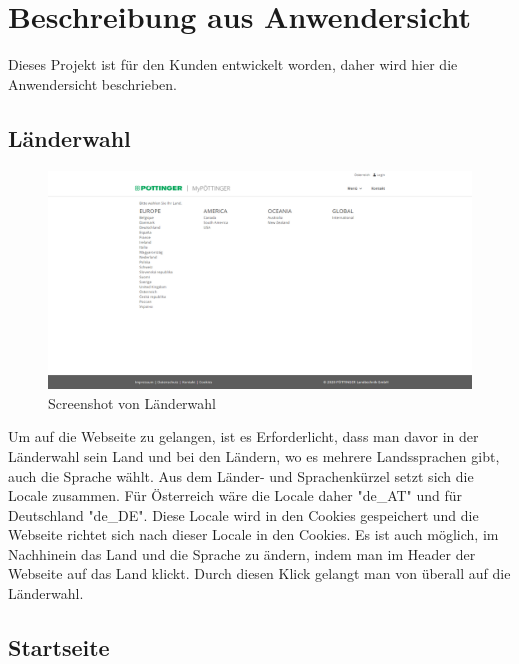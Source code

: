 \chapter{Beschreibung aus Anwendersicht} \label{anwendersicht}

Dieses Projekt ist für den Kunden entwickelt worden, daher wird hier die Anwendersicht beschrieben.

\section{Länderwahl}
\begin{figure}[h]
	\centerline{
		\includegraphics[width=1\textwidth]{./grafiken/erm_country_selection.png}
	}
	\vskip0pt
	\caption{Screenshot von Länderwahl} \label{fig:countrySelection}
\end{figure}
Um auf die Webseite zu gelangen, ist es Erforderlicht, dass man davor in der Länderwahl sein Land und bei den Ländern, wo es mehrere Landssprachen gibt, auch die Sprache wählt. Aus dem Länder- und Sprachenkürzel setzt sich die Locale zusammen. Für Österreich wäre die Locale daher "de\_AT" und für Deutschland "de\_DE". Diese Locale wird in den Cookies gespeichert und die Webseite richtet sich nach dieser Locale in den Cookies. Es ist auch möglich, im Nachhinein das Land und die Sprache zu ändern, indem man im Header der Webseite auf das Land klickt. Durch diesen Klick gelangt man von überall auf die Länderwahl.

\section{Startseite}
